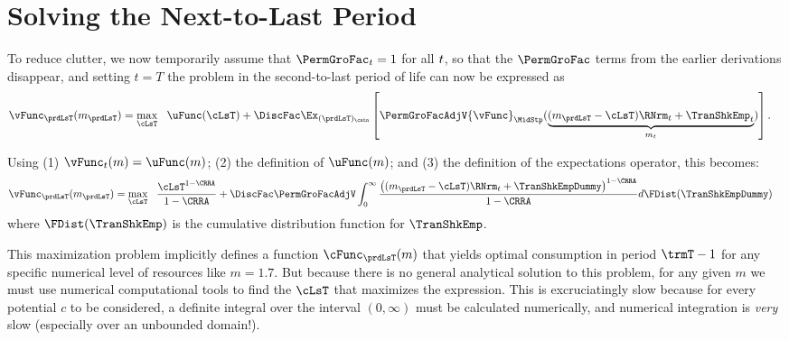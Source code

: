 \documentclass[\econtexRoot/SolvingMicroDSOPs]{subfiles}
\begin{document}
\hypertarget{solving-the-next-to-last-period}{}
\hypertarget{solving-the-next}{}
\section{Solving the Next-to-Last Period}\label{sec:solving-the-next}

To reduce clutter, we now temporarily assume that $\PermGroFac_{\prd}=1$ for all $t$, so that the $\PermGroFac$ terms from the earlier derivations disappear, and setting $t=T$ the problem in the second-to-last period of life can now be expressed as
\begin{equation*}\begin{gathered}\begin{aligned}
      {\vFunc}_{\prdLsT}({m}_{\prdLsT})  & = \max_{\cLsT} ~~ \uFunc(\cLsT) +
      \DiscFac \Ex_{({\prdLsT})_\cntn} \left[\PermGroFacAdjV{\vFunc}_{\MidStp}(\underbrace{({m}_{\prdLsT}-\cLsT)\RNrm_{\prdT} + \TranShkEmp_{\prdT}}_{{m}_{\prdT}})\right].
    \end{aligned}\end{gathered}\end{equation*}

Using (1) $\vFunc_{\prdT}({m})=\uFunc({m})$; (2) the definition of $\uFunc({m})$; and (3) the definition of the expectations operator, this becomes: %
\begin{equation*}\begin{gathered}\begin{aligned}
      {\vFunc}_{\prdLsT}({m}_{\prdLsT})   & = \max_{\cLsT} ~~
      \frac{\cLsT^{1-\CRRA}}{1-\CRRA} + \DiscFac \PermGroFacAdjV\int_{0}^{\infty}
      \frac{\left(({m}_{\prdLsT}-\cLsT)\RNrm_{\prdT}+ \TranShkEmpDummy\right)^{1-\CRRA}}{1-\CRRA}
      d\FDist(\TranShkEmpDummy)
    \end{aligned}\end{gathered}\end{equation*}
where $\FDist(\TranShkEmp)$ is the cumulative distribution function for ${\TranShkEmp}$.

\lstset{basicstyle=\ttfamily\footnotesize,breaklines=true,language=Python,frame=single}


This maximization problem implicitly defines a function $\cFunc_{\prdLsT}({m})$ that yields optimal consumption in period $\trmT-1$ for any specific numerical level of resources like ${m}=1.7$.  But because there is no general analytical solution to this problem, for any given ${m}$ we must use numerical computational tools to find the $\cLsT$ that maximizes the expression.  This is excruciatingly slow because for every potential ${c}$ to be considered, a definite integral over the interval $(0,\infty)$ must be calculated numerically, and numerical integration is \textit{very} slow (especially over an unbounded domain!).
\end{document}
